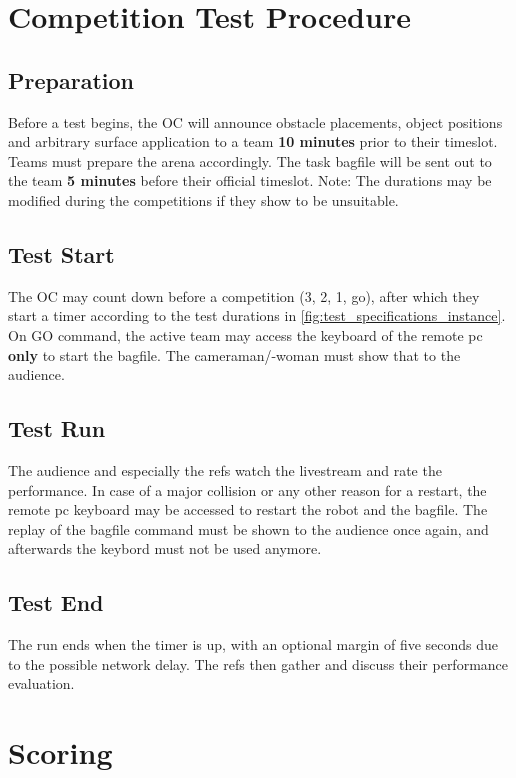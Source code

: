 \section{Competition Test Procedure} 
\label{sec:VRCTestExec}

\subsection{Preparation} 

Before a test begins, the OC will announce obstacle placements, object positions and arbitrary surface application to a team \textbf{10 minutes} prior to their timeslot. Teams must prepare the arena accordingly. The task bagfile will be sent out to the team \textbf{5 minutes} before their official timeslot. Note: The durations may be modified during the competitions if they show to be unsuitable.

\subsection{Test Start} 

The OC may count down before a competition (3, 2, 1, go), after which they start a timer according to the test durations in \ref{fig:test_specifications_instance}. On GO command, the active team may access the keyboard of the remote pc \textbf{only} to start the bagfile. The cameraman/-woman must show that to the audience.

\subsection{Test Run} 

The audience and especially the refs watch the livestream and rate the performance. In case of a major collision or any other reason for a restart, the remote pc keyboard may be accessed to restart the robot and the bagfile. The replay of the bagfile command must be shown to the audience once again, and afterwards the keybord must not be used anymore.

\subsection{Test End} 

The run ends when the timer is up, with an optional margin of five seconds due to the possible network delay. The refs then gather and discuss their performance evaluation.  

\section{Scoring} 
\label{sec:VRCScoring}

